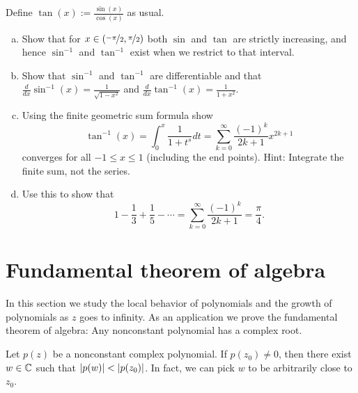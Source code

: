 \begin{exercise}
Define $\tan(x) := \frac{\sin(x)}{\cos(x)}$ as usual.
\begin{enumerate}[a)]
\item
Show that for $x \in (\nicefrac{-\pi}{2},\nicefrac{\pi}{2})$
both $\sin$ and $\tan$ are strictly increasing, and hence $\sin^{-1}$
and $\tan^{-1}$ exist when we restrict to that interval.
\item
Show that $\sin^{-1}$ and $\tan^{-1}$ are differentiable
and
that
$\frac{d}{dx} \sin^{-1}(x) = \frac{1}{\sqrt{1-x^2}}$ and
$\frac{d}{dx} \tan^{-1}(x) = \frac{1}{1+x^2}$.
\item
Using the finite geometric sum formula show
\begin{equation*}
\tan^{-1}(x) = \int_0^x \frac{1}{1+t^s} dt
=
\sum_{k=0}^\infty \frac{{(-1)}^k}{2k+1} x^{2k+1}
\end{equation*}
converges for all $-1 \leq x \leq 1$ (including the end points).
Hint: Integrate the finite sum, not the series.
\item
Use this to show that
\begin{equation*}
1 - \frac{1}{3} + \frac{1}{5} - \cdots
=
\sum_{k=0}^\infty \frac{{(-1)}^k}{2k+1}
=
\frac{\pi}{4} .
\end{equation*}
\end{enumerate}
\end{exercise}


\sectionnewpage
\section{Fundamental theorem of algebra}
\label{sec:fundalgeb}


In this section we study the local behavior of polynomials
and the growth of polynomials as $z$ goes to infinity.  As an application
we prove the fundamental theorem of algebra: Any nonconstant polynomial
has a complex root.

\begin{lemma} \label{lemma:polyalwaysgetssmaller}
Let $p(z)$ be a nonconstant complex polynomial.  If $p(z_0) \not= 0$, then there
exist $w \in {\mathbb{C}}$ such that $\lvert {p(w)} \rvert < \lvert {p(z_0)} \rvert$.  In fact,
we can pick $w$ to be arbitrarily close to $z_0$.
\end{lemma}

